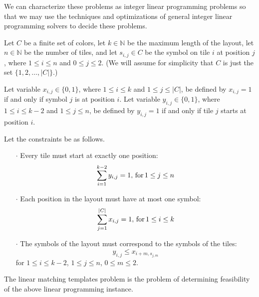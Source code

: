 We can characterize these problems as integer linear programming problems so
that we may use the techniques and optimizations of general integer linear
programming solvers to decide these problems.

\begin{shaded}
\begin{definition}
  Let $C$ be a finite set of colors, let $k\in\mathbb{N}$ be the maximum
  length of the layout, let $n\in\mathbb{N}$ be the number of tiles, and let
  $s_{i,j}\in C$ be the symbol on tile $i$ at position $j$, where $1\leq i\leq
  n$ and $0\leq j\leq 2$. (We will assume for simplicity that $C$ is just the
  set $\{1, 2,\ldots, |C|\}$.)

  Let variable $x_{i,j}\in\{0, 1\}$, where $1\leq i\leq k$ and $1\leq j\leq
  |C|$, be defined by $x_{i, j} = 1$ if and only if symbol $j$ is at position
  $i$. Let variable $y_{i,j}\in\{0, 1\}$, where $1\leq i\leq k-2$ and $1\leq
  j\leq n$, be defined by $y_{i, j} = 1$ if and only if tile $j$ starts at
  position $i$.
    
  Let the constraints be as follows.
  \begin{itemize}
  \item[$\cdot$] Every tile must start at exactly one position:
    \begin{displaymath}
      \sum_{i = 1}^{k - 2}{y_{i, j}} = 1,\,\textnormal{for}\, 1\leq j\leq n
    \end{displaymath}
  \item[$\cdot$] Each position in the layout must have at most one symbol:
    \begin{displaymath}
      \sum_{j = 1}^{|C|}{x_{i, j}} = 1,\,\textnormal{for}\, 1\leq i\leq k
    \end{displaymath}
  \item[$\cdot$] The symbols of the layout must correspond to the symbols of
    the tiles:
    \begin{displaymath}
      y_{i, j} \leq x_{i + m, s_{j, m}}
    \end{displaymath}
    for $1\leq i\leq k - 2$, $1\leq j\leq n$, $0\leq m\leq 2$.
  \end{itemize}
    
  The linear matching templates problem is the problem of determining
  feasibility of the above linear programming instance.
\end{definition}
\end{shaded}
